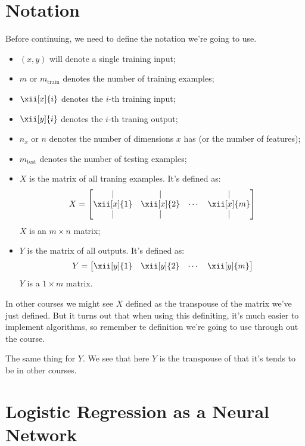 \documentclass[12pt, a4paper, oneside]{book}
\begin{document}
\section{Notation}%
\label{sec:notation}

Before continuing, we need to define the notation we're going to use.

\begin{itemize}
    \item $(x,y)$ will denote a single training input;
    \item $m$ or $m_{\text{train}}$ denotes the number of training examples;
    \item $\xii[x]{i}$ denotes the $i$-th training input;
    \item $\xii[y]{i}$ denotes the $i$-th traning output;
    \item $n_x$ or $n$ denotes the number of dimensions $x$ has (or the number
        of features);
    \item $m_{\text{test}}$ denotes the number of testing examples;
    \item $X$ is the matrix of all traning examples. It's defined as:
        \[
        X = \begin{bmatrix}
            | & | &  & | \\
            \xii[x]{1} & \xii[x]{2} & \cdots & \xii[x]{m} \\
            | & | &  & | \\
        \end{bmatrix}
        \]
        $X$ is an $m\times n$ matrix;
    \item $Y$ is the matrix of all outputs. It's defined as:
        \[
        Y = \begin{bmatrix}
            \xii[y]{1} & \xii[y]{2} & \cdots & \xii[y]{m}
        \end{bmatrix}
        \]
        $Y$ is a $1\times m$ matrix.
\end{itemize}

\begin{obs}
In other courses we might see $X$ defined as the transpouse of the matrix we've
just defined. But it turns out that when using this definiting, it's much easier
to implement algorithms, so remember te definition we're going to use through out
the course.

The same thing for $Y$. We see that here $Y$ is the transpouse of that it's
tends to be in other courses.
\end{obs}

\section{Logistic Regression as a Neural Network}%
\label{par:logistic_regression_as_a_neural_network}
\end{document}
